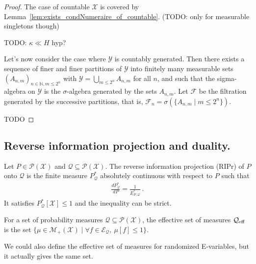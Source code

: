 \begin{proof}
The case of countable $\mathcal{X}$ is covered by Lemma~\ref{lem:exists_condNumeraire_of_countable}. (TODO: only for measurable singletons though)

TODO: $\kappa \ll H$ hyp?

Let's now consider the case where $\mathcal{Y}$ is countably generated.
Then there exists a sequence of finer and finer partitions of $\mathcal{Y}$ into finitely many measurable sets $(A_{n,m})_{n \in \mathbb{N}, m \le 2^n}$ with $\mathcal{Y} = \bigcup_{m \le 2^n} A_{n,m}$ for all $n$, and such that the sigma-algebra on $\mathcal{Y}$ is the $\sigma$-algebra generated by the sets $A_{n,m}$.
Let $\mathcal{F}$ be the filtration generated by the successive partitions, that is, $\mathcal{F}_n = \sigma(\{A_{n,m} \mid m \le 2^n\})$.

TODO
\end{proof}




\subsection{Reverse information projection and duality.}

\begin{definition}\label{def:ripr}
Let $P \in \mathcal{P}(\mathcal{X})$ and $\mathcal{Q} \subseteq \mathcal{P}(\mathcal{X})$.
The reverse information projection (RIPr) of $P$ onto $\mathcal{Q}$ is the finite measure $P^*_{\mathcal{Q}}$ absolutely continuous with respect to $P$ such that
\begin{align*}
  \frac{dP^*_{\mathcal{Q}}}{dP} = \frac{1}{E^*_{P, \mathcal{Q}}} \: .
\end{align*}
It satisfies $P^*_{\mathcal{Q}}[\mathcal{X}] \le 1$ and the inequality can be strict.
\end{definition}


\begin{definition}\label{def:effectiveSet}
For a set of probability measures $\mathcal{Q} \subseteq \mathcal{P}(\mathcal{X})$, the effective set of measures $\mathcal{Q}_{\operatorname{eff}}$ is the set $\{\mu \in \mathcal{M}_+(\mathcal{X}) \mid \forall f \in \mathcal{E}_{\mathcal{Q}}, \: \mu[f] \le 1\}$.
\end{definition}

We could also define the effective set of measures for randomized E-variables, but it actually gives the same set.


